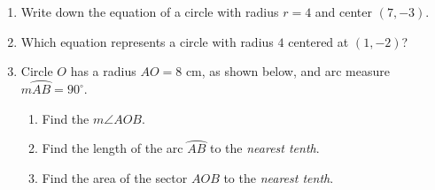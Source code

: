 \documentclass[12pt, twoside]{article}
\begin{document}
\begin{enumerate}
  \item Write down the equation of a circle with radius $r=4$ and center $(7,-3)$. \vspace{2cm}

  \item Which equation represents a circle with radius $4$ centered at $(1,-2)$?
   \begin{enumerate}
   \end{enumerate} \vspace{4cm}

   \item Circle $O$ has a radius $AO=8$ cm, as shown below, and arc measure $m \wideparen{AB}=90^\circ$.
      \begin{multicols}{2}
      \columnbreak
        \begin{enumerate}
          \item Find the $m \angle AOB$. \vspace{1cm}
          \item Find the length of the arc $\wideparen{AB}$ to the \emph{nearest tenth}. \vspace{3cm}
          \item Find the area of the sector $AOB$ to the \emph{nearest tenth}. %
        \end{enumerate}
      \end{multicols}

\end{enumerate}
\end{document}
